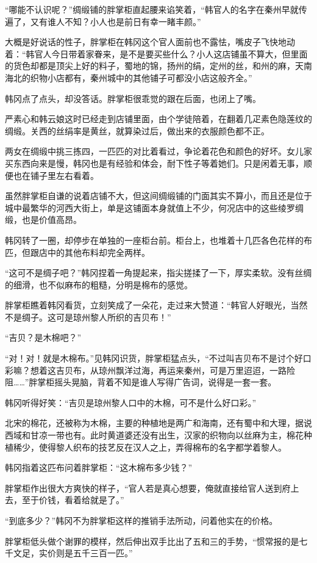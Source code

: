 “哪能不认识呢？”绸缎铺的胖掌柜直起腰来谄笑着，“韩官人的名字在秦州早就传遍了，又有谁人不知？小人也是前日有幸一睹丰颜。”

大概是好说话的性子，胖掌柜在韩冈这个官人面前也不露怯，嘴皮子飞快地动着：“韩官人今日带着家眷来，是不是要买些什么？小人这店铺虽不算大，但里面的货色却都是顶尖上好的料子，蜀地的锦，扬州的绢，定州的丝，和州的麻，天南海北的织物小店都有，秦州城中的其他铺子可都没小店这般齐全。”

韩冈点了点头，却没答话。胖掌柜很乖觉的跟在后面，也闭上了嘴。

严素心和韩云娘这时已经走到店铺里面，由个学徒陪着，在翻着几疋素色隐莲纹的绸缎。关西的丝绢率是黄丝，就算染过后，做出来的衣服颜色都不正。

两女在绸缎中挑三拣四，一匹匹的对比着看过，争论着花色和颜色的好坏。女儿家买东西向来是慢，韩冈也是有经验和体会，耐下性子等着她们。只是闲着无事，顺便也在铺子里左右看着。

虽然胖掌柜自谦的说着店铺不大，但这间绸缎铺的门面其实不算小，而且还是位于城中最繁华的河西大街上，单是这铺面本身就值上不少，何况店中的这些绫罗绸缎，也是价值高昂。

韩冈转了一圈，却停步在单独的一座柜台前。柜台上，也堆着十几匹各色花样的布匹，但跟店中的其他布料却完全两样。

“这可不是绸子吧？”韩冈捏着一角提起来，指尖搓揉了一下，厚实柔软。没有丝绸的细滑，也不似麻布的粗糙，分明是棉布的感觉。

胖掌柜瞧着韩冈看货，立刻笑成了一朵花，走过来大赞道：“韩官人好眼光，当然不是绸子。这可是琼州黎人所织的吉贝布！”

“吉贝？是木棉吧？”

“对！对！就是木棉布。”见韩冈识货，胖掌柜猛点头，“不过叫吉贝布不是讨个好口彩嘛？想着这吉贝布，从琼州飘洋过海，再运来秦州，可是万里迢迢，一路险阻……”胖掌柜摇头晃脑，背着不知是谁人写得广告词，说得是一套一套。

韩冈听得好笑：“吉贝是琼州黎人口中的木棉，可不是什么好口彩。”

北宋的棉花，还被称为木棉，主要的种植地是两广和海南，还有蜀中和大理，据说西域和甘凉一带也有。此时黄道婆还没有出生，汉家的织物向以丝麻为主，棉花种植稀少，使得黎人织布的技艺反在汉人之上，弄得棉布的名字都学着黎人。

韩冈指着这匹布问着胖掌柜：“这木棉布多少钱？”

胖掌柜作出很大方爽快的样子，“官人若是真心想要，俺就直接给官人送到府上去，至于价钱，看着给就是了。”

“到底多少？”韩冈不为胖掌柜这样的推销手法所动，问着他实在的价格。

胖掌柜低头做个谢罪的模样，然后伸出双手比出了五和三的手势，“惯常报的是七千文足，实价则是五千三百一匹。”

